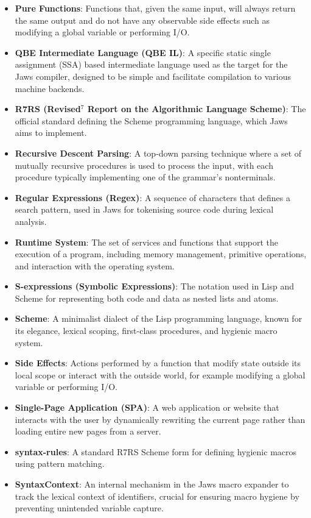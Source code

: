 \documentclass[final]{cmpreport_02}
\begin{document}
\begin{itemize}
    \item \textbf{Pure Functions}: Functions that, given the same input, will always return the same output and do not have any observable side effects such as modifying a global variable or performing I/O.
    \item \textbf{QBE Intermediate Language (QBE IL)}: A specific static single assignment (SSA) based intermediate language used as the target for the Jaws compiler, designed to be simple and facilitate compilation to various machine backends.
    \item \textbf{R7RS (Revised$^7$ Report on the Algorithmic Language Scheme)}: The official standard defining the Scheme programming language, which Jaws aims to implement.
    \item \textbf{Recursive Descent Parsing}: A top-down parsing technique where a set of mutually recursive procedures is used to process the input, with each procedure typically implementing one of the grammar's nonterminals.
    \item \textbf{Regular Expressions (Regex)}: A sequence of characters that defines a search pattern, used in Jaws for tokenising source code during lexical analysis.
    \item \textbf{Runtime System}: The set of services and functions that support the execution of a program, including memory management, primitive operations, and interaction with the operating system.
    \item \textbf{S-expressions (Symbolic Expressions)}: The notation used in Lisp and Scheme for representing both code and data as nested lists and atoms.
    \item \textbf{Scheme}: A minimalist dialect of the Lisp programming language, known for its elegance, lexical scoping, first-class procedures, and hygienic macro system.
    \item \textbf{Side Effects}: Actions performed by a function that modify state outside its local scope or interact with the outside world, for example modifying a global variable or performing I/O.
    \item \textbf{Single-Page Application (SPA)}: A web application or website that interacts with the user by dynamically rewriting the current page rather than loading entire new pages from a server.
    \item \textbf{syntax-rules}: A standard R7RS Scheme form for defining hygienic macros using pattern matching.
    \item \textbf{SyntaxContext}: An internal mechanism in the Jaws macro expander to track the lexical context of identifiers, crucial for ensuring macro hygiene by preventing unintended variable capture.

\end{itemize}
\end{document}
